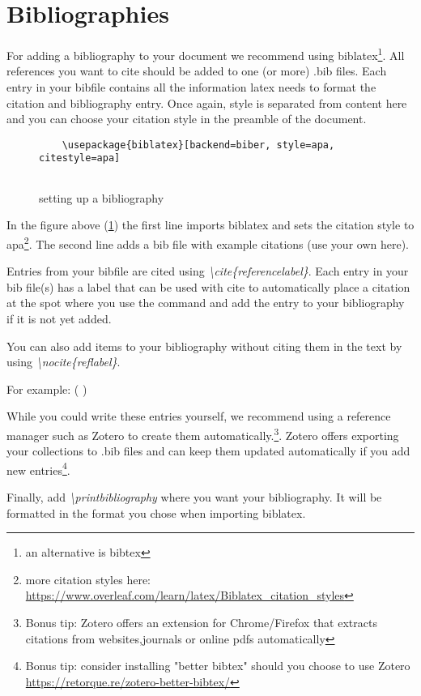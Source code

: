 \section{Bibliographies}

For adding a bibliography to your document we recommend using biblatex\footnote{an alternative is bibtex}.
All references you want to cite should be added to one (or more) .bib files.
Each entry in your bibfile contains all the information latex needs to format the citation and bibliography entry.
Once again, style is separated from content here and you can choose your citation style in the preamble of the document.
\begin{figure}[h!]
    \begin{verbatim}
    \usepackage{biblatex}[backend=biber, style=apa, citestyle=apa]
    
    \end{verbatim}
    \caption{setting up a bibliography}
    \label{fig:bibliography}
\end{figure}

In the figure above (\ref{fig:bibliography}) the first line imports biblatex and sets the citation style to apa\footnote{more citation styles here: \url{https://www.overleaf.com/learn/latex/Biblatex_citation_styles}}.
The second line adds a bib file with example citations (use your own here).

Entries from your bibfile are cited using \textit{\textbackslash cite\{referencelabel\}}. Each entry in your bib file(s) has a label that can be used with cite to automatically place a citation at the spot where you use the command and add the entry to your bibliography if it is not yet added.

You can also add items to your bibliography without citing them in the text by using \textit{\textbackslash nocite\{reflabel\}}.

For example: (\cite{springer} \cite{aristotle:anima})

\nocite{companion}
\nocite{iliad}

While you could write these entries yourself, we recommend using a reference manager such as Zotero to create them automatically.\footnote{Bonus tip: Zotero offers an extension for Chrome/Firefox that extracts citations from websites,journals or online pdfs automatically}. Zotero offers exporting your collections to .bib files and can keep them updated automatically if you add new entries\footnote{Bonus tip: consider installing "better bibtex" should you choose to use Zotero \url{https://retorque.re/zotero-better-bibtex/}}.

Finally, add \textit{\textbackslash printbibliography} where you want your bibliography. It will be formatted in the format you chose when importing biblatex.
